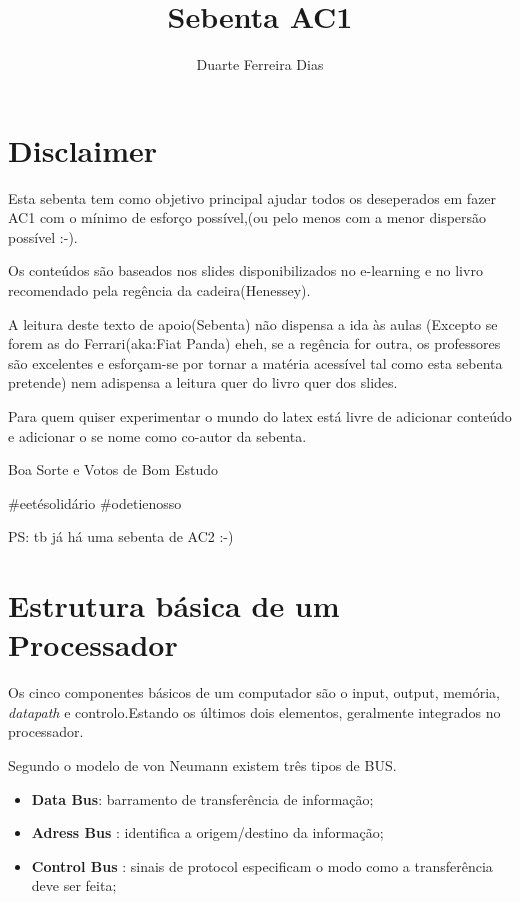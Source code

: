 \documentclass[10pt,a4paper]{book}
\author{Duarte Ferreira Dias }
\title{Sebenta AC1}
\begin{document}
\maketitle
\tableofcontents{}
\chapter{Disclaimer}

	Esta sebenta tem como objetivo principal ajudar todos os deseperados em fazer AC1 com o mínimo de esforço possível,(ou pelo menos com a menor dispersão possível :-).

	Os conteúdos são baseados nos slides disponibilizados no e-learning e no livro recomendado pela regência da cadeira(Henessey).

	A leitura deste texto de apoio(Sebenta) não dispensa a ida às aulas (Excepto se forem as do Ferrari(aka:Fiat Panda) eheh, se a regência for outra, os professores são excelentes e esforçam-se por tornar a matéria acessível tal como esta sebenta pretende) nem adispensa a leitura quer do livro quer dos slides.

	Para quem quiser experimentar o mundo do latex está livre de adicionar conteúdo e adicionar o se nome como co-autor da sebenta.

	Boa Sorte e Votos de Bom Estudo

	#eetésolidário #odetienosso

	PS: tb já há uma sebenta de AC2 :-)


\chapter{Estrutura básica de um Processador}

	Os cinco componentes básicos de um computador são o input, output, memória, \textit{datapath} e controlo.Estando os últimos dois elementos, geralmente integrados no processador.

	Segundo o modelo de von Neumann existem três tipos de BUS.
		\begin{itemize}
			\item \textbf{Data Bus}: barramento de transferência de informação;
			\item \textbf{Adress Bus} : identifica a origem/destino da informação;
			\item \textbf{Control Bus} : sinais de protocol especificam o modo como a transferência deve ser feita;
		\end{itemize}
\end{document}
